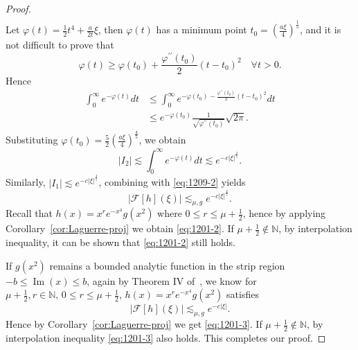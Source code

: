 \documentclass[pdflatex,sn-aps]{sn-jnl}%
\theoremstyle{thmstyleone}%
\theoremstyle{thmstyletwo}%
\theoremstyle{thmstylethree}%
\begin{document}
\begin{appendices}
\begin{proof}
\begin{equation}
\begin{aligned}
    \end{aligned}
  \end{equation} 
  Let $\varphi(t)=\frac{1}{2}t^4+\frac{a}{2 t} \xi$, then $\varphi(t)$
  has a minimum point $t_0 =\left(\frac{a \xi}{4}\right)^{\frac{1}{5}}$,
  and it is not difficult to prove that
  \begin{equation}\label{eq:1118-10}
    \varphi(t) \geqslant \varphi\left(t_0\right)+\frac{\varphi^{\prime \prime}\left(t_0\right)}{2}\left(t-t_0\right)^2 \quad \forall t>0.
  \end{equation}
  Hence
  \begin{equation}\label{eq:1118-11}
    \begin{aligned}
    \int_0^{\infty} e^{-\varphi(t)} dt & \leqslant \int_0^{\infty} e^{-\varphi\left(t_0\right)-\frac{\varphi^{\prime \prime}\left(t_0\right)}{2}\left(t-t_0\right)^2} d t \\
    & \leqslant e^{-\varphi\left(t_0\right)} \frac{1}{\sqrt{\varphi^{\prime \prime}\left(t_0\right)}} \sqrt{2 \pi}.
    \end{aligned}
  \end{equation}
  Substituting $\varphi\left(t_0\right)=\frac{5}{2}\left(\frac{a \xi}{4}\right)^{\frac{4}{5}}$,
  we obtain
  \begin{equation}\label{eq:1118-12}
    \left| I_2 \right| \lesssim \int_0^{\infty} e^{-\varphi(t)} dt \lesssim e^{-c|\xi|^{\frac{4}{5}}}.
  \end{equation}
  Similarly, $\left|I_1\right| \lesssim e^{-c|\xi|^{\frac{4}{5}}}$, combining
  with \eqref{eq:1209-2} yields
  \begin{equation}\label{eq:1118-13}
    \left|\mathcal{F}[h](\xi)\right| \lesssim_{\mu, g} e^{-c|\xi|^{\frac{4}{5}}}.
  \end{equation}
  Recall that $h(x) = x^r e^{-x^4} g(x^2)$ where $0 \leqslant r \leqslant \mu + \frac{1}{2}$,
  hence by applying Corollary~\ref{cor:Laguerre-proj} we obtain \eqref{eq:1201-2}.
  If $\mu + \frac{1}{2} \notin \mathbb{N}$, by interpolation inequality, it can be shown that \eqref{eq:1201-2} still holds.

  If $g(x^2)$ remains a bounded analytic function in the strip region
  $-b \leqslant \operatorname{Im}(x) \leqslant b$, again by Theorem IV of~\cite{paley1934fourier},
  we know for $\mu+\frac{1}{2}, r \in \mathbb{N},\,0 \leqslant r \leqslant \mu + \frac{1}{2}$,
  $h(x) = x^r e^{-x^4} g(x^2)$ satisfies
  \begin{equation}\label{eq:h-ideal-decay}
    \left|\mathcal{F}[h](\xi)\right| \lesssim_{\mu, g} e^{-c|\xi|}.
  \end{equation}
  Hence by Corollary~\ref{cor:Laguerre-proj} we get \eqref{eq:1201-3}. If
  $\mu + \frac{1}{2} \notin \mathbb{N}$, by interpolation inequality
  \eqref{eq:1201-3} also holds. This completes our proof.
\end{proof}
\end{appendices}
\end{document}
